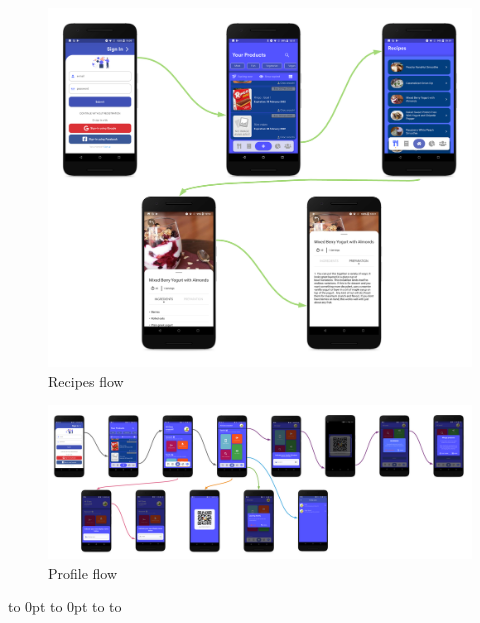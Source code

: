 
\begin{figure}[H]
   \centering
  \centerline{\includegraphics[width=190mm,scale=0.9]{./Images/flowdiagram/recipes.png}}
  \caption{Recipes flow}
\end{figure}



\def\fillandplacepagenumber{%
 \par\pagestyle{empty}%
\vbox to 0pt{\vss}\vfill
\vbox to 0pt{\baselineskip0pt
   \hbox to\linewidth{\hss}%
   \setlength{\footskip}{70pt}
   \baselineskip\footskip
   \hbox to\linewidth{%
     \hfil\thepage\hfil}\vss}}

\begin{landscape}
\begin{figure}[h]
\vspace*{-2cm}
\noindent
\centering
\centerline{\includegraphics[scale = 0.6]{./Images/flowdiagram/user_info.png}}
\vspace*{-1cm}
    \caption{Profile flow}
    \vspace*{-12cm}
\end{figure}
\fillandplacepagenumber
\end{landscape}




